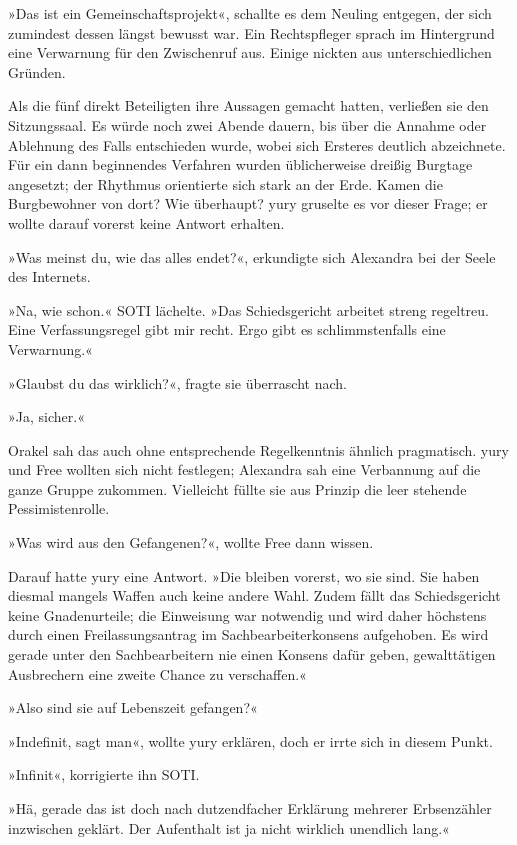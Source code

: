 »Das ist ein Gemeinschaftsprojekt«, schallte es dem Neuling entgegen, der sich zumindest dessen längst bewusst war. Ein Rechtspfleger sprach im Hintergrund eine Verwarnung für den Zwischenruf aus. Einige nickten aus unterschiedlichen Gründen.

Als die fünf direkt Beteiligten ihre Aussagen gemacht hatten, verließen sie den Sitzungssaal. Es würde noch zwei Abende dauern, bis über die Annahme oder Ablehnung des Falls entschieden wurde, wobei sich Ersteres deutlich abzeichnete. Für ein dann beginnendes Verfahren wurden üblicherweise dreißig Burgtage angesetzt; der Rhythmus orientierte sich stark an der Erde. Kamen die Burgbewohner von dort? Wie überhaupt? yury gruselte es vor dieser Frage; er wollte darauf vorerst keine Antwort erhalten.

»Was meinst du, wie das alles endet?«, erkundigte sich Alexandra bei der Seele des Internets.

»Na, wie schon.« SOTI lächelte. »Das Schiedsgericht arbeitet streng regeltreu. Eine Verfassungsregel gibt mir recht. Ergo gibt es schlimmstenfalls eine Verwarnung.«

»Glaubst du das wirklich?«, fragte sie überrascht nach.

»Ja, sicher.«

Orakel sah das auch ohne entsprechende Regelkenntnis ähnlich pragmatisch. yury und Free wollten sich nicht festlegen; Alexandra sah eine Verbannung auf die ganze Gruppe zukommen. Vielleicht füllte sie aus Prinzip die leer stehende Pessimistenrolle.

»Was wird aus den Gefangenen?«, wollte Free dann wissen.

Darauf hatte yury eine Antwort. »Die bleiben vorerst, wo sie sind. Sie haben diesmal mangels Waffen auch keine andere Wahl. Zudem fällt das Schiedsgericht keine Gnadenurteile; die Einweisung war notwendig und wird daher höchstens durch einen Freilassungsantrag im Sachbearbeiterkonsens aufgehoben. Es wird gerade unter den Sachbearbeitern nie einen Konsens dafür geben, gewalttätigen Ausbrechern eine zweite Chance zu verschaffen.«

»Also sind sie auf Lebenszeit gefangen?«

»Indefinit, sagt man«, wollte yury erklären, doch er irrte sich in diesem Punkt.

»Infinit«, korrigierte ihn SOTI.

»Hä, gerade das ist doch nach dutzendfacher Erklärung mehrerer Erbsenzähler inzwischen geklärt. Der Aufenthalt ist ja nicht wirklich unendlich lang.«

